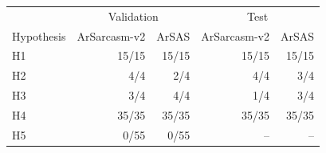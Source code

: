 \begin{tabular}{lrrrr}
\toprule
 & \multicolumn{2}{c}{Validation} & \multicolumn{2}{c}{Test} \\
Hypothesis & ArSarcasm-v2 & ArSAS & ArSarcasm-v2 & ArSAS \\
\midrule
H1 & 15/15 & 15/15 & 15/15 & 15/15 \\
H2 & 4/4 & 2/4 & 4/4 & 3/4 \\
H3 & 3/4 & 4/4 & 1/4 & 3/4 \\
H4 & 35/35 & 35/35 & 35/35 & 35/35 \\
H5 & 0/55 & 0/55 & -- & -- \\
\bottomrule
\end{tabular}
